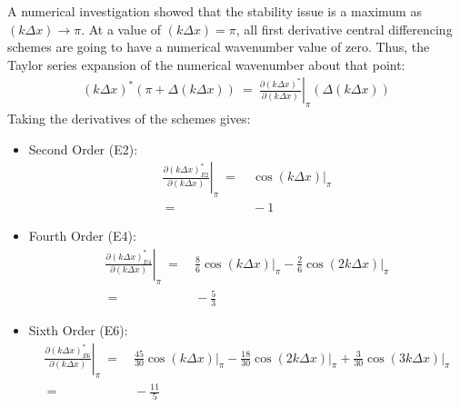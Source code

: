 \documentclass[conf]{new-aiaa}
\begin{document}
{{A numerical investigation showed that the stability issue is a maximum as $\left(k\Delta{x}\right)\to\pi$. At a value of $\left(k\Delta{x}\right)=\pi$, all first derivative central differencing schemes are going to have a numerical wavenumber value of zero. Thus, the Taylor series expansion of the numerical wavenumber about that point:
\begin{equation}
	\begin{split}
		\label{eq:TS_Numerical_Wave}
  			\left(k\Delta{x}\right)^*\left(\pi+\Delta\left(k\Delta{x}\right)\right)~=~\left.\frac{\partial\left({k\Delta{x}}\right)^*}{\partial\left({k\Delta{x}}\right)}\right|_{\pi}\left(\Delta\left(k\Delta{x}\right)\right)
	\end{split}
\end{equation}
Taking the derivatives of the schemes gives:
\begin{itemize}
	\item Second Order (E2):
		\begin{equation*}
			\begin{split}
  			\left.\frac{\partial\left({k\Delta{x}}\right)^*_{E2}}{\partial\left({k\Delta{x}}\right)}\right|_{\pi}~=&~\left.\cos\left({k\Delta{x}}\right)\right|_{\pi} \\
  			~=&~-1 
				\end{split}		
				\end{equation*}
	\item Fourth Order (E4):
		\begin{equation*}
			\begin{split}
  			\left.\frac{\partial\left({k\Delta{x}}\right)^*_{E4}}{\partial\left({k\Delta{x}}\right)}\right|_{\pi}~=&~\frac{8}{6}\left.\cos\left({k\Delta{x}}\right)\right|_{\pi}-\frac{2}{6}\left.\cos\left(2{k\Delta{x}}\right)\right|_{\pi} \\
  			~=&~-\frac{5}{3} 
				\end{split}
		\end{equation*}	
	\item Sixth Order (E6):
		\begin{equation*}
			\begin{split}
  			\left.\frac{\partial\left({k\Delta{x}}\right)^*_{E6}}{\partial\left({k\Delta{x}}\right)}\right|_{\pi}~=&~\frac{45}{30}\left.\cos\left({k\Delta{x}}\right)\right|_{\pi}-\frac{18}{30}\left.\cos\left(2{k\Delta{x}}\right)\right|_{\pi}+\frac{3}{30}\left.\cos\left(3{k\Delta{x}}\right)\right|_{\pi} \\
  			~=&~-\frac{11}{5}
				\end{split}

\end{equation*}
\end{itemize}}}
\end{document}
